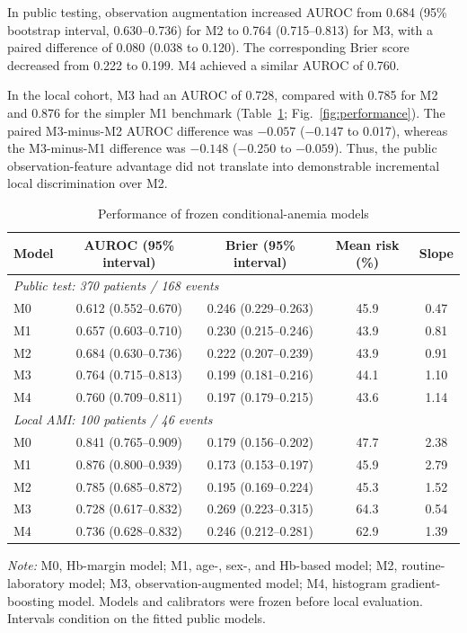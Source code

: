 \documentclass[pdflatex,sn-mathphys-num]{sn-jnl}%
\theoremstyle{thmstyleone}%
\theoremstyle{thmstyletwo}%
\theoremstyle{thmstylethree}%
\begin{document}
In public testing, observation augmentation increased AUROC from 0.684 (95\% bootstrap interval, 0.630--0.736) for M2 to 0.764 (0.715--0.813) for M3, with a paired difference of 0.080 (0.038 to 0.120). The corresponding Brier score decreased from 0.222 to 0.199. M4 achieved a similar AUROC of 0.760.

In the local cohort, M3 had an AUROC of 0.728, compared with 0.785 for M2 and 0.876 for the simpler M1 benchmark (Table~\ref{tab:frozen}; Fig.~\ref{fig:performance}). The paired M3-minus-M2 AUROC difference was $-0.057$ ($-0.147$ to 0.017), whereas the M3-minus-M1 difference was $-0.148$ ($-0.250$ to $-0.059$). Thus, the public observation-feature advantage did not translate into demonstrable incremental local discrimination over M2.

\begin{table}[!t]
\caption{Performance of frozen conditional-anemia models}
\label{tab:frozen}
\centering
\footnotesize
\setlength{\tabcolsep}{3pt}
\begin{tabular}{lcccc}
\toprule
Model & AUROC (95\% interval) & Brier (95\% interval)
& Mean risk (\%) & Slope\\
\midrule
\multicolumn{5}{l}{\textit{Public test: 370 patients / 168 events}}\\
M0 & 0.612 (0.552--0.670) & 0.246 (0.229--0.263) & 45.9 & 0.47\\
M1 & 0.657 (0.603--0.710) & 0.230 (0.215--0.246) & 43.9 & 0.81\\
M2 & 0.684 (0.630--0.736) & 0.222 (0.207--0.239) & 43.9 & 0.91\\
M3 & 0.764 (0.715--0.813) & 0.199 (0.181--0.216) & 44.1 & 1.10\\
M4 & 0.760 (0.709--0.811) & 0.197 (0.179--0.215) & 43.6 & 1.14\\
\midrule
\multicolumn{5}{l}{\textit{Local AMI: 100 patients / 46 events}}\\
M0 & 0.841 (0.765--0.909) & 0.179 (0.156--0.202) & 47.7 & 2.38\\
M1 & 0.876 (0.800--0.939) & 0.173 (0.153--0.197) & 45.9 & 2.79\\
M2 & 0.785 (0.685--0.872) & 0.195 (0.169--0.224) & 45.3 & 1.52\\
M3 & 0.728 (0.617--0.832) & 0.269 (0.223--0.315) & 64.3 & 0.54\\
M4 & 0.736 (0.628--0.832) & 0.246 (0.212--0.281) & 62.9 & 1.39\\
\bottomrule
\end{tabular}

\vspace{2mm}
\parbox{\textwidth}{\footnotesize
\textit{Note:} M0, Hb-margin model; M1, age-, sex-, and Hb-based
model; M2, routine-laboratory model; M3, observation-augmented
model; M4, histogram gradient-boosting model. Models and
calibrators were frozen before local evaluation.
Intervals condition on the fitted public models.
}
\end{table}
\end{document}
